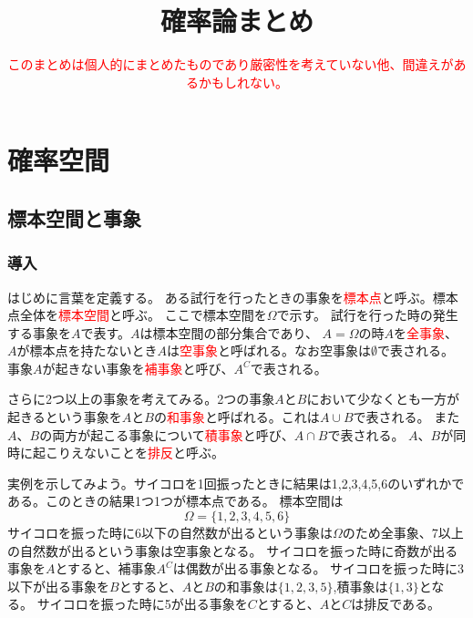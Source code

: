 \documentclass[a4paper,10pt]{jarticle}
\begin{document}
\title{確率論まとめ}
\date{\textcolor{red}{このまとめは個人的にまとめたものであり厳密性を考えていない他、間違えがあるかもしれない。}}
\maketitle
\tableofcontents
\newpage
\section{確率空間}
\subsection{標本空間と事象}
\subsubsection{導入}
はじめに言葉を定義する。
ある試行を行ったときの事象を\textcolor{red}{標本点}と呼ぶ。標本点全体を\textcolor{red}{標本空間}と呼ぶ。
ここで標本空間を$\Omega$で示す。
試行を行った時の発生する事象を$A$で表す。$A$は標本空間の部分集合であり、
$A=\Omega$の時$A$を\textcolor{red}{全事象}、$A$が標本点を持たないとき$A$は\textcolor{red}{空事象}と呼ばれる。なお空事象は$\emptyset$で表される。
事象$A$が起きない事象を\textcolor{red}{補事象}と呼び、$A^C$で表される。

さらに2つ以上の事象を考えてみる。2つの事象$A$と$B$において少なくとも一方が起きるという事象を$A$と$B$の\textcolor{red}{和事象}と呼ばれる。これは$A\cup B$で表される。
また$A$、$B$の両方が起こる事象について\textcolor{red}{積事象}と呼び、$A\cap B$で表される。
$A$、$B$が同時に起こりえないことを\textcolor{red}{排反}と呼ぶ。

実例を示してみよう。サイコロを1回振ったときに結果は1,2,3,4,5,6のいずれかである。このときの結果1つ1つが標本点である。
標本空間は
\begin{equation}
    \Omega = \{1,2,3,4,5,6\}\tag{1,1}
\end{equation}
サイコロを振った時に6以下の自然数が出るという事象は$\Omega$のため全事象、7以上の自然数が出るという事象は空事象となる。
サイコロを振った時に奇数が出る事象を$A$とすると、補事象$A^C$は偶数が出る事象となる。
サイコロを振った時に3以下が出る事象を$B$とすると、$A$と$B$の和事象は$\{1,2,3,5\}$,積事象は$\{1,3\}$となる。
サイコロを振った時に5が出る事象を$C$とすると、$A$と$C$は排反である。
\end{document}
